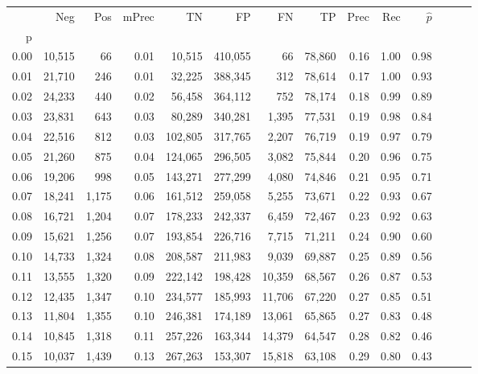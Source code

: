 \begin{tabular}{rrrrrrrrrrrrrr}
\toprule
{} &     Neg &    Pos & mPrec &       TN &       FP &      FN &      TP &  Prec &   Rec & $\hat{p}$ \\
p    &         &        &       &          &          &         &         &       &       &           \\
\midrule
0.00 &  10,515 &     66 &  0.01 &   10,515 &  410,055 &      66 &  78,860 &  0.16 &  1.00 &      0.98 \\
0.01 &  21,710 &    246 &  0.01 &   32,225 &  388,345 &     312 &  78,614 &  0.17 &  1.00 &      0.93 \\
0.02 &  24,233 &    440 &  0.02 &   56,458 &  364,112 &     752 &  78,174 &  0.18 &  0.99 &      0.89 \\
0.03 &  23,831 &    643 &  0.03 &   80,289 &  340,281 &   1,395 &  77,531 &  0.19 &  0.98 &      0.84 \\
0.04 &  22,516 &    812 &  0.03 &  102,805 &  317,765 &   2,207 &  76,719 &  0.19 &  0.97 &      0.79 \\
0.05 &  21,260 &    875 &  0.04 &  124,065 &  296,505 &   3,082 &  75,844 &  0.20 &  0.96 &      0.75 \\
0.06 &  19,206 &    998 &  0.05 &  143,271 &  277,299 &   4,080 &  74,846 &  0.21 &  0.95 &      0.71 \\
0.07 &  18,241 &  1,175 &  0.06 &  161,512 &  259,058 &   5,255 &  73,671 &  0.22 &  0.93 &      0.67 \\
0.08 &  16,721 &  1,204 &  0.07 &  178,233 &  242,337 &   6,459 &  72,467 &  0.23 &  0.92 &      0.63 \\
0.09 &  15,621 &  1,256 &  0.07 &  193,854 &  226,716 &   7,715 &  71,211 &  0.24 &  0.90 &      0.60 \\
0.10 &  14,733 &  1,324 &  0.08 &  208,587 &  211,983 &   9,039 &  69,887 &  0.25 &  0.89 &      0.56 \\
0.11 &  13,555 &  1,320 &  0.09 &  222,142 &  198,428 &  10,359 &  68,567 &  0.26 &  0.87 &      0.53 \\
0.12 &  12,435 &  1,347 &  0.10 &  234,577 &  185,993 &  11,706 &  67,220 &  0.27 &  0.85 &      0.51 \\
0.13 &  11,804 &  1,355 &  0.10 &  246,381 &  174,189 &  13,061 &  65,865 &  0.27 &  0.83 &      0.48 \\
0.14 &  10,845 &  1,318 &  0.11 &  257,226 &  163,344 &  14,379 &  64,547 &  0.28 &  0.82 &      0.46 \\
0.15 &  10,037 &  1,439 &  0.13 &  267,263 &  153,307 &  15,818 &  63,108 &  0.29 &  0.80 &      0.43 \\

\end{tabular}
